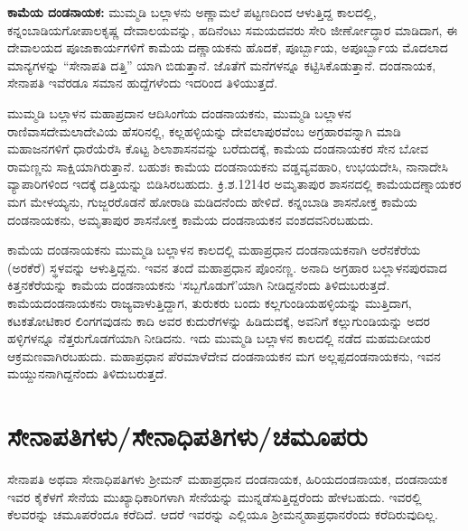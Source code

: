 \textbf{ಕಾಮೆಯ ದಂಡನಾಯಕ:} ಮುಮ್ಮಡಿ ಬಲ್ಲಾಳನು ಅಣ್ಣಾಮಲೆ ಪಟ್ಟಣದಿಂದ ಆಳುತ್ತಿದ್ದ ಕಾಲದಲ್ಲಿ, ಕನ್ನಂಬಾಡಿಯ\break ಗೋಪಾಲಕೃಷ್ಣ ದೇವಾಲಯವನ್ನು, ಹದಿನೆಂಟು ಸಮಯದವರು ಸೇರಿ ಜೀರ್ಣೋದ್ಧಾರ ಮಾಡಿದಾಗ, ಈ ದೇವಾಲಯದ ಪೂಜಾಕಾರ್ಯಗಳಿಗೆ ಕಾಮೆಯ ದಣ್ಣಾಯಕನು ಹೊದಕೆ, ಪೂರ್ಬ್ಬಾಯ, ಅಪೂರ್ಬ್ಬಾಯ ಮೊದಲಾದ ಮಾನ್ಯಗಳನ್ನು “ಸೇನಾಪತಿ ದತ್ತಿ” ಯಾಗಿ ಬಿಡುತ್ತಾನೆ. ಜೊತೆಗೆ ಮನೆಗಳನ್ನೂ ಕಟ್ಟಿಸಿಕೊಡುತ್ತಾನೆ. ದಂಡನಾಯಕ, ಸೇನಾಪತಿ ಇವೆರಡೂ ಸಮಾನ ಹುದ್ದೆಗಳೆಂದು ಇದರಿಂದ ತಿಳಿಯುತ್ತದೆ.

ಮುಮ್ಮಡಿ ಬಲ್ಲಾಳನ ಮಹಾಪ್ರದಾನ ಆದಿಸಿಂಗೆಯ ದಂಡನಾಯಕನು, ಮುಮ್ಮಡಿ ಬಲ್ಲಾಳನ ರಾಣಿವಾಸ\break ದೇಮಲಾದೇವಿಯ ಹೆಸರಿನಲ್ಲಿ, ಕಲ್ಲಹಳ್ಳಿಯನ್ನು ದೇವಲಾಪುರವೆಂಬ ಅಗ್ರಹಾರವನ್ನಾಗಿ ಮಾಡಿ ಮಹಾಜನಗಳಿಗೆ ಧಾರೆಯೆರೆಸಿ ಕೊಟ್ಟ ಶಿಲಾಶಾಸನವನ್ನು ಬರೆದುದಕ್ಕೆ, ಕಾಮೆಯ ದಂಡನಾಯಕರ ಸೇನ ಬೋವ ರಾಮಣ್ಣನು ಸಾಕ್ಷಿಯಾಗಿರುತ್ತಾನೆ. ಬಹುಶಃ ಕಾಮೆಯ ದಂಡನಾಯಕನು ವಡ್ಡವ್ಯವಹಾರಿ, ಉಭಯದೇಸಿ, ನಾನಾದೇಸಿ ವ್ಯಾಪಾರಿಗಳಿಂದ ಇದಕ್ಕೆ ದತ್ತಿಯನ್ನು ಬಿಡಿಸಿರಬಹುದು. ಕ್ರಿ.ಶ.1214ರ ಅಮೃತಾಪುರ ಶಾಸನದಲ್ಲಿ ಕಾಮೆಯದಣ್ನಾಯಕರ ಮಗ ಮೇಳಯ್ಯನು, ಗುಜ್ಜರರೊಡನೆ ಹೋರಾಡಿ ಮಡಿದನೆಂದು ಹೇಳಿದೆ. ಕನ್ನಂಬಾಡಿ ಶಾಸನೋಕ್ತ ಕಾಮೆಯ ದಂಡನಾಯಕನು, ಅಮೃತಾಪುರ ಶಾಸನೋಕ್ತ ಕಾಮೆಯ ದಂಡನಾಯಕನ ವಂಶದವನಿರಬಹುದು.

ಕಾಮೆಯ ದಂಡನಾಯಕನು ಮುಮ್ಮಡಿ ಬಲ್ಲಾಳನ ಕಾಲದಲ್ಲಿ ಮಹಾಪ್ರಧಾನ ದಂಡನಾಯಕನಾಗಿ ಅರೆನಕೆರೆಯ (ಅರಕೆರೆ) ಸ್ಥಳವನ್ನು ಆಳುತ್ತಿದ್ದನು. ಇವನ ತಂದೆ ಮಹಾಪ್ರಧಾನ ಪೊಂನಣ್ಣ. ಅನಾದಿ ಅಗ್ರಹಾರ ಬಲ್ಲಾಳನಪುರವಾದ ಕಿತ್ತನಕೆರೆಯನ್ನು ಕಾಮೆಯ ದಂಡನಾಯಕನು ‘ಸಬ್ಬಗೊಡುಗೆ’ಯಾಗಿ ನೀಡಿದ್ದನೆಂದು ತಿಳಿದುಬರುತ್ತದೆ. ಕಾಮೆಯದಂಡ\-ನಾಯಕನು ರಾಜ್ಯವಾಳುತ್ತಿದ್ದಾಗ, ತುರುಕರು ಬಂದು ಕಲ್ಲಗುಂಡಿಯಹಳ್ಳಿಯನ್ನು ಮುತ್ತಿದಾಗ, ಕಟಕತೋಟಿಕಾರ ಲಿಂಗಗವುಡನು ಕಾದಿ ಅವರ ಕುದುರೆಗಳನ್ನು ಹಿಡಿದುದಕ್ಕೆ, ಅವನಿಗೆ ಕಲ್ಲುಗುಂಡಿಯನ್ನು ಅದರ ಹಳ್ಳಿಗಳನ್ನೂ ನೆತ್ತರುಗೊಡಗೆಯಾಗಿ ನೀಡಿದನು. ಇದು ಮುಮ್ಮಡಿ ಬಲ್ಲಾಳನ ಕಾಲದಲ್ಲಿ ನಡೆದ ಮಹಮದೀಯರ ಆಕ್ರಮಣವಾಗಿರಬಹುದು. ಮಹಾಪ್ರಧಾನ ಪೆರಮಾಳೆದೇವ ದಂಡನಾಯಕನ ಮಗ ಅಲ್ಲಪ್ಪದಂಡನಾಯಕನು, ಇವನ ಮಯ್ದುನನಾಗಿದ್ದನೆಂದು ತಿಳಿದುಬರುತ್ತದೆ.


\section*{ಸೇನಾಪತಿಗಳು/ಸೇನಾಧಿಪತಿಗಳು/ಚಮೂಪರು}

ಸೇನಾಪತಿ ಅಥವಾ ಸೇನಾಧಿಪತಿಗಳು ಶ‍್ರೀಮನ್​ ಮಹಾಪ್ರಧಾನ ದಂಡನಾಯಕ, ಹಿರಿಯದಂಡನಾಯಕ, ದಂಡನಾಯಕ ಇವರ ಕೈಕೆಳಗೆ ಸೇನೆಯ ಮುಖ್ಯಾಧಿಕಾರಿಗಳಾಗಿ ಸೇನೆಯನ್ನು ಮುನ್ನಡೆಸುತ್ತಿದ್ದರೆಂದು ಹೇಳಬಹುದು. ಇವರಲ್ಲಿ ಕೆಲವರನ್ನು ಚಮೂಪರೆಂದೂ ಕರೆದಿದೆ. ಆದರೆ ಇವರನ್ನು ಎಲ್ಲಿಯೂ ಶ‍್ರೀಮನ್ಮಹಾಪ್ರಧಾನರೆಂದು ಕರೆದಿರುವುದಿಲ್ಲ.

